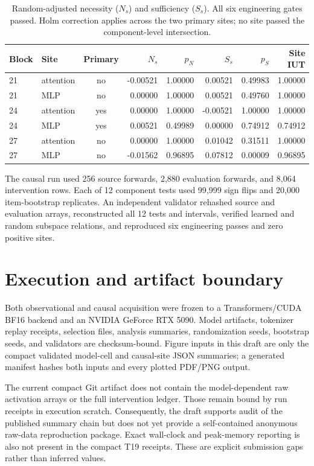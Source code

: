 \documentclass{article}
\begin{document}
\begin{table}[H]
\centering
\scriptsize
\setlength{\tabcolsep}{3pt}
\begin{tabular}{llcrrrrr}
\toprule
Block & Site & Primary & $N_s$ & $p_N$ & $S_s$ & $p_S$ & Site IUT \\
\midrule
21 & attention & no  & -0.00521 & 1.00000 &  0.00521 & 0.49983 & 1.00000 \\
21 & MLP       & no  &  0.00000 & 1.00000 &  0.00521 & 0.49760 & 1.00000 \\
24 & attention & yes &  0.00000 & 1.00000 & -0.00521 & 1.00000 & 1.00000 \\
24 & MLP       & yes &  0.00521 & 0.49989 &  0.00000 & 0.74912 & 0.74912 \\
27 & attention & no  &  0.00000 & 1.00000 &  0.01042 & 0.31511 & 1.00000 \\
27 & MLP       & no  & -0.01562 & 0.96895 &  0.07812 & 0.00009 & 0.96895 \\
\bottomrule
\end{tabular}
\caption{Random-adjusted necessity ($N_s$) and sufficiency ($S_s$). All six
engineering gates passed. Holm correction applies across the two primary
sites; no site passed the component-level intersection.}
\label{tab:causal}
\end{table}

The causal run used 256 source forwards, 2,880 evaluation forwards, and 8,064
intervention rows. Each of 12 component tests used 99,999 sign flips and
20,000 item-bootstrap replicates. An independent validator rehashed source and
evaluation arrays, reconstructed all 12 tests and intervals, verified learned
and random subspace relations, and reproduced six engineering passes and zero
positive sites.

\section{Execution and artifact boundary}
\label{app:artifact}

Both observational and causal acquisition were frozen to a Transformers/CUDA
BF16 backend and an NVIDIA GeForce RTX 5090. Model artifacts, tokenizer replay
receipts, selection files, analysis summaries, randomization seeds, bootstrap
seeds, and validators are checksum-bound. Figure inputs in this draft are only
the compact validated model-cell and causal-site JSON summaries; a generated
manifest hashes both inputs and every plotted PDF/PNG output.

The current compact Git artifact does not contain the model-dependent raw
activation arrays or the full intervention ledger. Those remain bound by run
receipts in execution scratch. Consequently, the draft supports audit of the
published summary chain but does not yet provide a self-contained anonymous
raw-data reproduction package. Exact wall-clock and peak-memory reporting is
also not present in the compact T19 receipts. These are explicit submission
gaps rather than inferred values.


\end{document}
